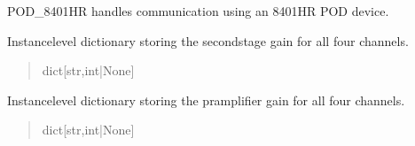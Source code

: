 \documentclass[letterpaper,10pt,english]{sphinxmanual}
\begin{document}
\begin{fulllineitems}
\sphinxAtStartPar
POD\_8401HR handles communication using an 8401\sphinxhyphen{}HR POD device.

\begin{fulllineitems}
\label{\detokenize{PodApi.Devices:PodApi.Devices.PodDevice_8401HR.Pod8401HR._ssGain}}
\pysigstartsignatures
{}
\pysigstopsignatures
\sphinxAtStartPar
Instance\sphinxhyphen{}level dictionary storing the second\sphinxhyphen{}stage gain for all             four channels.
\begin{quote}\begin{description}
\sphinxAtStartPar
dict{[}str,int|None{]}

\end{description}\end{quote}

\end{fulllineitems}


\begin{fulllineitems}
\label{\detokenize{PodApi.Devices:PodApi.Devices.PodDevice_8401HR.Pod8401HR._preampGain}}
\pysigstartsignatures
{}
\pysigstopsignatures
\sphinxAtStartPar
Instance\sphinxhyphen{}level dictionary storing the pramplifier gain for             all four channels.
\begin{quote}\begin{description}
\sphinxAtStartPar
dict{[}str,int|None{]}

\end{description}\end{quote}

\end{fulllineitems}



\end{fulllineitems}
\end{document}
